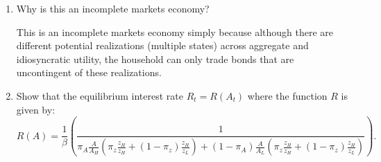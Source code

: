 \documentclass[11pt,english]{article}
\begin{document}
\begin{enumerate}
    \item[(a)] Why is this an incomplete markets economy?
    \begin{solution}
 This is an incomplete markets economy simply because although there are different potential realizations (multiple states) across aggregate and idiosyncratic utility, the household can only trade bonds that are uncontingent of these realizations.
    \end{solution}
 
    \item[(b)] Show that the equilibrium interest rate $R_t = R(A_t)$ where the
        function $R$ is given by:
        \[
            R(A) = \frac{1}{\beta}\left(
                \frac{1}{
                    \displaystyle
                    \pi_A \frac{A}{A_H}
                    \!\left(\pi_z \frac{z_H}{z_H} + (1-\pi_z)\frac{z_H}{z_L}\right)
                    + (1-\pi_A) \frac{A}{A_L}
                    \!\left(\pi_z \frac{z_H}{z_H} + (1-\pi_z)\frac{z_H}{z_L}\right)
                }
            \right).
        \]
 

\end{enumerate}
\end{document}
